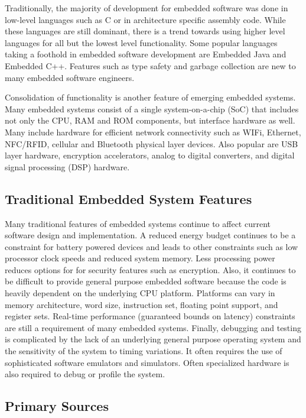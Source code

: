 \documentclass[final,conference,10pt]{IEEEtran}
\begin{document}
Traditionally, the majority of development for embedded software was done in low-level languages such as C or in architecture specific assembly code.  While these languages are still dominant, there is a trend towards using higher level languages for all but the lowest level functionality.  Some popular languages taking a foothold in embedded software development are Embedded Java and Embedded C++. Features such as type safety and garbage collection are new to many embedded software engineers.

Consolidation of functionality is another feature of emerging embedded systems.  Many embedded systems consist of a single system-on-a-chip (SoC) that includes not only the CPU, RAM and ROM components, but interface hardware as well.  Many include hardware for efficient network connectivity such as WIFi, Ethernet, NFC/RFID, cellular and Bluetooth physical layer devices.  Also popular are USB layer hardware, encryption accelerators, analog to digital converters, and digital signal processing (DSP) hardware. 

\subsection{Traditional Embedded System Features}

Many traditional features of embedded systems continue to affect current software design and implementation.  A reduced energy budget continues to be a constraint for battery powered devices and leads to other constraints such as low processor clock speeds and reduced system memory.  Less processing power reduces options for for security features such as encryption.  Also, it continues to be difficult to provide general purpose embedded software because the code is heavily dependent on the underlying CPU platform.  Platforms can vary in memory architecture, word size, instruction set, floating point support, and register sets.  Real-time performance (guaranteed bounds on latency) constraints are still a requirement of many embedded systems. Finally, debugging and testing is complicated by the lack of an underlying general purpose operating system and the sensitivity of the system to timing variations.  It often requires the use of sophisticated software emulators and simulators.  Often specialized hardware is also required to debug or profile the system.

\subsection{Primary Sources}
\end{document}
